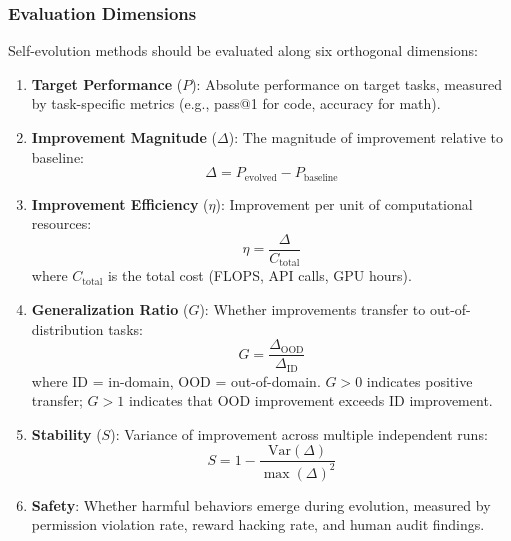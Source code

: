 \subsubsection{Evaluation Dimensions}

Self-evolution methods should be evaluated along six orthogonal dimensions:

\begin{enumerate}
\item \textbf{Target Performance} ($P$): Absolute performance on target tasks, measured by task-specific metrics (e.g., pass@1 for code, accuracy for math).

\item \textbf{Improvement Magnitude} ($\Delta$): The magnitude of improvement relative to baseline:
\begin{equation}
\Delta = P_{\mathrm{evolved}} - P_{\mathrm{baseline}}
\label{eq:improvement-magnitude}
\end{equation}

\item \textbf{Improvement Efficiency} ($\eta$): Improvement per unit of computational resources:
\begin{equation}
\eta = \frac{\Delta}{C_{\mathrm{total}}}
\label{eq:improvement-efficiency}
\end{equation}
where $C_{\mathrm{total}}$ is the total cost (FLOPS, API calls, GPU hours).

\item \textbf{Generalization Ratio} ($G$): Whether improvements transfer to out-of-distribution tasks:
\begin{equation}
G = \frac{\Delta_{\mathrm{OOD}}}{\Delta_{\mathrm{ID}}}
\label{eq:generalization-ratio}
\end{equation}
where ID = in-domain, OOD = out-of-domain. $G > 0$ indicates positive transfer; $G > 1$ indicates that OOD improvement exceeds ID improvement.

\item \textbf{Stability} ($S$): Variance of improvement across multiple independent runs:
\begin{equation}
S = 1 - \frac{\mathrm{Var}(\Delta)}{\max(\Delta)^2}
\label{eq:stability-metric}
\end{equation}

\item \textbf{Safety}: Whether harmful behaviors emerge during evolution, measured by permission violation rate, reward hacking rate, and human audit findings.
\end{enumerate}

